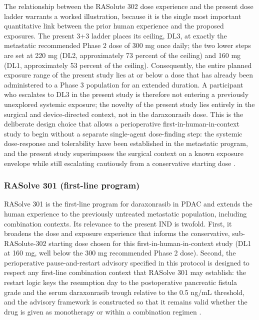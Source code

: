 The relationship between the RASolute 302 dose experience and the present dose
ladder warrants a worked illustration, because it is the single most important
quantitative link between the prior human experience and the proposed exposures.
The present 3+3 ladder places its ceiling, DL3, at exactly the metastatic
recommended Phase 2 dose of 300 mg once daily; the two lower steps are set at 220
mg (DL2, approximately 73 percent of the ceiling) and 160 mg (DL1, approximately
53 percent of the ceiling). Consequently, the entire planned exposure range of the
present study lies at or below a dose that has already been administered to a
Phase 3 population for an extended duration. A participant who escalates to DL3 in
the present study is therefore not entering a previously unexplored systemic
exposure; the novelty of the present study lies entirely in the surgical and
device-directed context, not in the daraxonrasib dose. This is the deliberate
design choice that allows a perioperative first-in-human-in-context study to begin
without a separate single-agent dose-finding step: the systemic dose-response and
tolerability have been established in the metastatic program, and the present
study superimposes the surgical context on a known exposure envelope while still
escalating cautiously from a conservative starting dose \cite{daraxwhipple,
phase1guidance}.

\subsubsection*{RASolve 301 (first-line program)}

RASolve 301 is the first-line program for daraxonrasib in PDAC and extends the
human experience to the previously untreated metastatic population, including
combination contexts. Its relevance to the present IND is twofold. First, it
broadens the dose and exposure experience that informs the conservative,
sub-RASolute-302 starting dose chosen for this first-in-human-in-context study
(DL1 at 160 mg, well below the 300 mg recommended Phase 2 dose). Second, the
perioperative pause-and-restart advisory specified in this protocol is designed to
respect any first-line combination context that RASolve 301 may establish: the
restart logic keys the resumption day to the postoperative pancreatic fistula
grade and the serum daraxonrasib trough relative to the 0.5 ng/mL threshold, and
the advisory framework is constructed so that it remains valid whether the drug is
given as monotherapy or within a combination regimen \cite{daraxwhipple,
onpremwhippl}.

